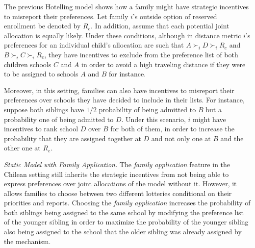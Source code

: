 \documentclass{article}
\newcommand{\tomas}[1]{{\color{red}\textbf{[T:#1]}}}
\begin{document}
\vspace{1cm}

The previous Hotelling model shows how a family might have strategic incentives to misreport their preferences. Let family $i$'s outside option of reserved enrollment be denoted by $R_e$. In addition, assume that each potential joint allocation is equally likely. Under these conditions, although in distance metric $i$'s preferences for an individual child's allocation are such that $A\succ_i D \succ_i R_e$ and $B\succ_i C \succ_i R_e$, they have incentives to exclude from the preference list of both children schools $C$ and $A$ in order to avoid a high traveling distance if they were to be assigned to schools $A$ and $B$ for instance. 

Moreover, in this setting, families can also have incentives to misreport their preferences over schools they have decided to include in their lists. For instance, suppose both siblings have $1/2$ probability of being admitted to $B$ but a probability one of being admitted to $D$. Under this scenario, $i$ might have incentives to rank school $D$ over $B$ for both of them, in order to increase the probability that they are assigned together at $D$ and not only one at $B$ and the other one at $R_e$. 


\textit{Static Model with Family Application.} The \textit{family application} feature in the Chilean setting still inherits the strategic incentives from not being able to express preferences over joint allocations of the model without it. However, it allows families to choose between two different lotteries conditional on their priorities and reports. Choosing the \textit{family application} increases the probability of both siblings being assigned to the same school by modifying the preference list of the younger sibling in order to maximize the probability of the younger sibling also being assigned to the school that the older sibling was already assigned by the mechanism.     
\end{document}
